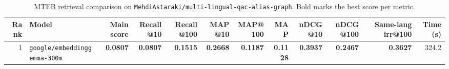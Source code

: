 \begin{table}[t]
\centering
\small
\begin{tabular}{r l r r r r r r r r r r}
\hline
Rank & Model & Main score & Recall@10 & Recall@100 & MAP@10 & MAP@100 & MAP & nDCG@10 & nDCG@100 & Same-lang irr@100 & Time (s) \\
\hline
1 & \texttt{google/embeddinggemma-300m} & \textbf{0.0807} & \textbf{0.0807} & \textbf{0.1515} & \textbf{0.2668} & \textbf{0.1187} & \textbf{0.1128} & \textbf{0.3937} & \textbf{0.2467} & \textbf{0.3627} & 324.2 \\
\hline
\end{tabular}
\caption{MTEB retrieval comparison on \texttt{MehdiAstaraki/multi-lingual-qac-alias-graph}. Bold marks the best score per metric.}
\label{tab:mteb-model-comparison}
\end{table}
